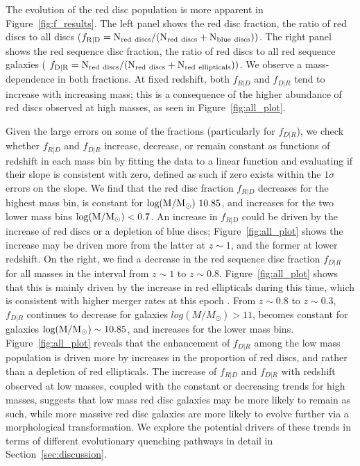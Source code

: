 \documentclass[useAMS,usenatbib]{mn2e}
\begin{document}
The evolution of the red disc population is more apparent in Figure~\ref{fig:f_results}.  The left panel shows the red disc fraction, the ratio of red discs to all discs ($f_{\rm R|D} = \rm N_{\rm red~discs}/(N_{\rm red~discs}+N_{\rm blue~discs}))$. The right panel shows the red sequence disc fraction, the ratio of red discs to all red sequence galaxies ( $f_{\rm D|R} = \rm N_{\rm red~discs}/(N_{\rm red~discs}+N_{\rm red~ellipticals}))$. We observe a mass-dependence in both fractions. At fixed redshift, both $f_{R|D}$ and $f_{D|R}$ tend to increase with increasing mass; this is a consequence of the higher abundance of red discs observed at high masses, as seen in Figure~\ref{fig:all_plot}. 

Given the large errors on some of the fractions (particularly for $f_{D|R}$), we check whether $f_{R|D}$ and $f_{D|R}$ increase, decrease, or remain constant as functions of redshift in each mass bin by fitting the data to a linear function and evaluating if their slope is consistent with zero, defined as such if zero exists within the $1 \sigma$ errors on the slope. We find that the red disc fraction $f_{R|D}$ decreases for the highest mass bin, is constant for $\rm log(M/M_{\odot})~10.85$, and increases for the two lower mass bins $\rm log(M/M_{\odot})<0.7$. An increase in $f_{R|D}$ could be driven by the increase of red discs or a depletion of blue discs; Figure~\ref{fig:all_plot} shows the increase may be driven more from the latter at $z\sim1$, and the former at lower redshift. On the right, we find a decrease in the red sequence disc fraction $f_{D|R}$ for all masses in the interval from $z\sim1$ to $z\sim0.8$. Figure~\ref{fig:all_plot} shows that this is mainly driven by the increase in red ellipticals during this time, which is consistent with higher merger rates at this epoch \citep{Molina2016}. From $z\sim0.8$ to $z\sim0.3$, $f_{D|R}$ continues to decrease for galaxies $log(M/M_{\odot})>11$, becomes constant for galaxies $\rm log(M/M_{\odot})\sim10.85$, and increases for the lower mass bins. Figure~\ref{fig:all_plot} reveals that the enhancement of $f_{D|R}$ among the low mass population is driven more by increases in the proportion of red discs, and rather than a depletion of red ellipticals. The increase of $f_{R|D}$ and $f_{D|R}$ with redshift observed at low masses, coupled with the constant or decreasing trends for high masses, suggests that low mass red disc galaxies may be more likely to remain as such, while more massive red disc galaxies are more likely to evolve further via a morphological transformation. We explore the potential drivers of these trends in terms of different evolutionary quenching pathways in detail in Section~\ref{sec:discussion}.
\end{document}
